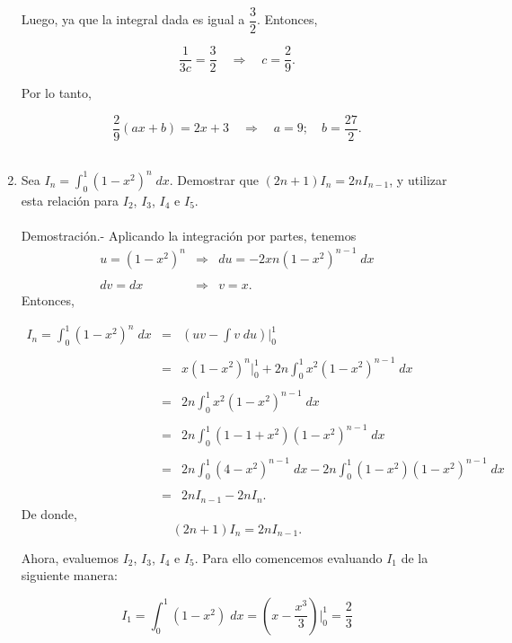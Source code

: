 \begin{enumerate}[\bfseries 1.]
	Luego, ya que la integral dada es igual a $\dfrac{3}{2}$. Entonces,

	$$\dfrac{1}{3c}=\dfrac{3}{2}\quad \Rightarrow  \quad c=\dfrac{2}{9}.$$

	Por lo tanto,

	$$\dfrac{2}{9}(ax+b)=2x+3 \quad \Rightarrow \quad a=9;\quad b=\dfrac{27}{2}.$$\\


    \item Sea $I_n = \displaystyle\int_0^1 \left(1-x^2\right)^n\; dx$. Demostrar que $(2n+1)I_n=2nI_{n-1}$, y utilizar esta relación para $I_2$, $I_3$, $I_4$ e $I_5$.\\\\
	Demostración.-\; Aplicando la integración por partes, tenemos
	$$
	\begin{array}{rcl}
	    u=\left(1-x^2\right)^n & \Rightarrow & du=-2xn\left(1-x^2\right)^{n-1}\; dx\\\\
	    dv=dx & \Rightarrow & v=x.
	\end{array}
	$$
	Entonces,

	$$
	\begin{array}{rcl}
	    I_n = \displaystyle\int_0^1\left(1-x^2\right)^n\; dx &=& \left(uv-\displaystyle\int v\; du\right)\bigg|_0^1\\\\
								 &=& x\left(1-x^2\right)^n\bigg|_0^1 +2n \displaystyle\int_0^1 x^2\left(1-x^2\right)^{n-1}\; dx\\\\
								 &=& 2n\displaystyle\int_0^1 x^2\left(1-x^2\right)^{n-1}\; dx\\\\
								 &=& 2n\displaystyle\int_0^1 \left(1-1+x^2\right)\left(1-x^2\right)^{n-1}\; dx\\\\
								 &=& 2n\displaystyle\int_0^1 \left(4-x^2\right)^{n-1}\; dx-2n\int_0^1 \left(1-x^2\right)\left(1-x^2\right)^{n-1}\; dx\\\\
								 &=& 2nI_{n-1} - 2nI_n.
	\end{array}
	$$
	De donde,
	$$(2n+1)I_n = 2nI_{n-1}.$$

	Ahora, evaluemos $I_2$, $I_3$, $I_4$ e $I_5$. Para ello comencemos evaluando $I_1$ de la siguiente manera:

	$$I_1=\displaystyle\int_0^1 \left(1-x^2\right)\; dx=\left(x-\dfrac{x^3}{3}\right)\bigg|_0^1=\dfrac{2}{3}$$


\end{enumerate}

